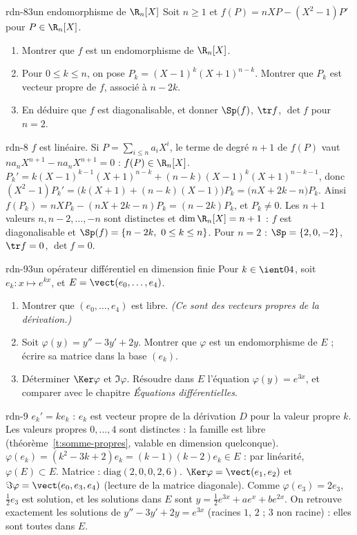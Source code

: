 \begin{exo}{rdn-8}{3}{un endomorphisme de $\R_n[X]$}
Soit $n\geq1$ et $f(P)=nXP-(X^2-1)P'$ pour $P\in\R_n[X]$.
\begin{enumerate}
\item Montrer que $f$ est un endomorphisme de $\R_n[X]$.
\item Pour $0\leq k\leq n$, on pose $P_k=(X-1)^k(X+1)^{n-k}$. Montrer que $P_k$ est vecteur propre de $f$, associé à $n-2k$.
\item En déduire que $f$ est diagonalisable, et donner $\Sp(f)$, $\tr f$, $\det f$ pour $n=2$.
\end{enumerate}
\end{exo}
\begin{corrige}{rdn-8}
 $f$ est linéaire. Si $P=\sum_{i\leq n}a_iX^i$, le terme de degré $n+1$ de $f(P)$ vaut $na_nX^{n+1}-na_nX^{n+1}=0$ : $f(P)\in\R_n[X]$.
 $P_k'=k(X-1)^{k-1}(X+1)^{n-k}+(n-k)(X-1)^k(X+1)^{n-k-1}$, donc
$(X^2-1)P_k'=\big(k(X+1)+(n-k)(X-1)\big)P_k=\big(nX+2k-n\big)P_k$. Ainsi $f(P_k)=nXP_k-(nX+2k-n)P_k=(n-2k)P_k$, et $P_k\neq0$.
 Les $n+1$ valeurs $n,n-2,\dots,-n$ sont distinctes et $\dim\R_n[X]=n+1$ : $f$ est diagonalisable et
$\Sp(f)=\{n-2k,\ 0\leq k\leq n\}$. Pour $n=2$ : $\Sp=\{2,0,-2\}$, $\tr f=0$, $\det f=0$.
\end{corrige}

\begin{exo}{rdn-9}{3}{un opérateur différentiel en dimension finie}
Pour $k\in\ient04$, soit $e_k:x\mapsto e^{kx}$, et $E=\vect(e_0,\dots,e_4)$.
\begin{enumerate}
\item Montrer que $(e_0,\dots,e_4)$ est libre. \emph{(Ce sont des vecteurs propres de la dérivation.)}
\item Soit $\varphi(y)=y''-3y'+2y$. Montrer que $\varphi$ est un endomorphisme de $E$ ; écrire sa matrice dans la base $(e_k)$.
\item Déterminer $\Ker\varphi$ et $\Im\varphi$. Résoudre dans $E$ l'équation $\varphi(y)=e^{3x}$, et comparer avec le chapitre
\emph{Équations différentielles}.
\end{enumerate}
\end{exo}
\begin{corrige}{rdn-9}
 $e_k'=ke_k$ : $e_k$ est vecteur propre de la dérivation $D$ pour la valeur propre $k$. Les valeurs propres $0,\dots,4$ sont
distinctes : la famille est libre (théorème~\ref{t:somme-propres}, valable en dimension quelconque).
 $\varphi(e_k)=(k^2-3k+2)e_k=(k-1)(k-2)e_k\in E$ : par linéarité, $\varphi(E)\subset E$. Matrice : $\mathrm{diag}(2,0,0,2,6)$.
 $\Ker\varphi=\vect(e_1,e_2)$ et $\Im\varphi=\vect(e_0,e_3,e_4)$ (lecture de la matrice diagonale). Comme $\varphi(e_3)=2e_3$,
$\frac12e_3$ est solution, et les solutions dans $E$ sont $y=\frac12e^{3x}+ae^x+be^{2x}$. On retrouve exactement les solutions
de $y''-3y'+2y=e^{3x}$ (racines $1$, $2$ ; $3$ non racine) : elles sont toutes dans $E$.
\end{corrige}

